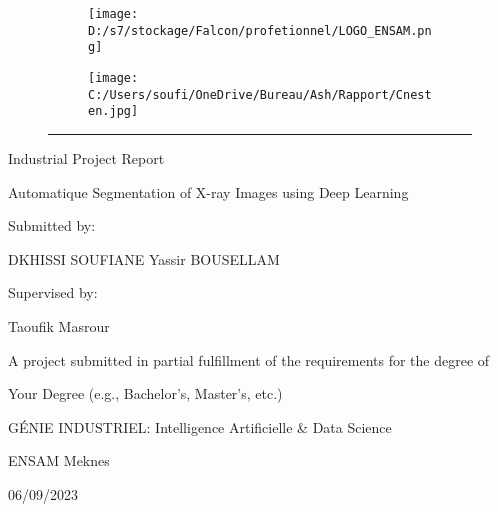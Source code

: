 \documentclass{report}
\newcommand{\falcon}{%
	\begin{figure}[htbp]
		\centering
		\begin{subfigure}{0.45\textwidth}
			\centering
			\texttt{[image: D:/s7/stockage/Falcon/profetionnel/LOGO\_ENSAM.png]}
		\end{subfigure}
		\begin{subfigure}{0.45\textwidth}
			\centering
			\texttt{[image: C:/Users/soufi/OneDrive/Bureau/Ash/Rapport/Cnesten.jpg]}
		\end{subfigure}
		\hrule %
	\end{figure}
}
\begin{document}
	
	\begin{titlepage}
		\falcon        
		\vspace*{2cm}
		
		\centering
		{\LARGE Industrial Project Report \par}
		
		\vspace{1cm}
		
		{\Large Automatique Segmentation of X-ray Images using Deep Learning \par}
		
		\vspace{1.5cm}
		
		{\large Submitted by: \par}
		\vspace{0.5cm}
		
		{\Large DKHISSI SOUFIANE \quad Yassir BOUSELLAM \par}
		
		\vspace{1cm}
		
		{\large Supervised by: \par}
		\vspace{0.5cm}
		
		{\Large Taoufik Masrour \par}
		
		\vfill
		
		{\large A project submitted in partial fulfillment of the requirements for the degree of \par}
		\vspace{0.5cm}
		
		{\Large Your Degree (e.g., Bachelor's, Master's, etc.) \par}
		
		\vspace{0.5cm}
		
		{\Large GÉNIE INDUSTRIEL: Intelligence Artificielle \& Data Science \par}
		
		\vspace{0.5cm}
		
		{\Large ENSAM Meknes \par}
		
		\vspace{0.5cm}
		
		{\Large 06/09/2023 \par}
	\end{titlepage}
	
\end{document}
